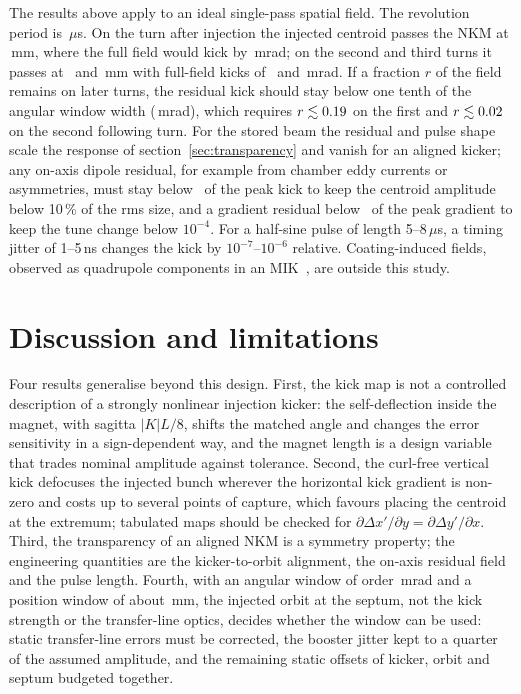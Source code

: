 \documentclass[a4paper,11pt]{article}
\begin{document}
The results above apply to an ideal single-pass spatial field. The revolution period is \RevPeriodUs\,$\mu$s. On the turn after injection the injected centroid passes the NKM at \TurnOneXmm\,mm, where the full field would kick by \TurnOneKickMrad\,mrad; on the second and third turns it passes at \TurnTwoXmm\ and \TurnThreeXmm\,mm with full-field kicks of \TurnTwoKickMrad\ and \TurnThreeKickMrad\,mrad. If a fraction $r$ of the field remains on later turns, the residual kick should stay below one tenth of the angular window width (\ResidualAllowMrad\,mrad), which requires $r\lesssim0.19$ on the first and $r\lesssim0.02$ on the second following turn. For the stored beam the residual and pulse shape scale the response of section~\ref{sec:transparency} and vanish for an aligned kicker; any on-axis dipole residual, for example from chamber eddy currents or asymmetries, must stay below \DipoleResidualRel\ of the peak kick to keep the centroid amplitude below 10\,\% of the rms size, and a gradient residual below \GradResidualRel\ of the peak gradient to keep the tune change below $10^{-4}$. For a half-sine pulse of length 5--8\,$\mu$s, a timing jitter of 1--5\,ns changes the kick by $10^{-7}$--$10^{-6}$ relative. Coating-induced fields, observed as quadrupole components in an MIK~\cite{Kallestrup2019}, are outside this study.

\section{Discussion and limitations}
\label{sec:discussion}

Four results generalise beyond this design. First, the kick map is not a controlled description of a strongly nonlinear injection kicker: the self-deflection inside the magnet, with sagitta $|K|L/8$, shifts the matched angle and changes the error sensitivity in a sign-dependent way, and the magnet length is a design variable that trades nominal amplitude against tolerance. Second, the curl-free vertical kick defocuses the injected bunch wherever the horizontal kick gradient is non-zero and costs up to several points of capture, which favours placing the centroid at the extremum; tabulated maps should be checked for $\partial\Delta x'/\partial y=\partial\Delta y'/\partial x$. Third, the transparency of an aligned NKM is a symmetry property; the engineering quantities are the kicker-to-orbit alignment, the on-axis residual field and the pulse length. Fourth, with an angular window of order \WinAngleWidth\,mrad and a position window of about \WinPosWidth\,mm, the injected orbit at the septum, not the kick strength or the transfer-line optics, decides whether the window can be used: static transfer-line errors must be corrected, the booster jitter kept to a quarter of the assumed amplitude, and the remaining static offsets of kicker, orbit and septum budgeted together.
\end{document}
